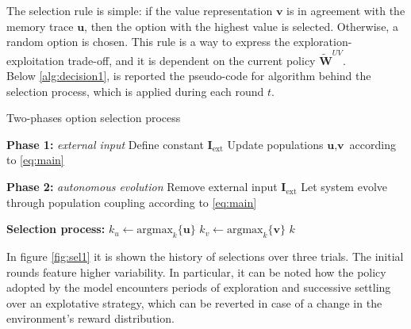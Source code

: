 \noindent The selection rule is simple: if the value representation $\textbf{v}$ is in agreement with the memory trace $\textbf{u}$, then the option with the highest value is selected. Otherwise, a random option is chosen.
This rule is a way to express the exploration-exploitation trade-off, and it is dependent on the current policy $\tilde{\textbf{W}}^{UV}$. \\ Below \ref{alg:decision1}, is reported the pseudo-code for algorithm behind the selection process, which is applied during each round $t$.

\begin{algorithm}[ht]
\caption{Two-phases option selection process}
\label{alg:decision}
\SetAlgoLined
{}


\textbf{Phase 1:} \textit{external input} 
Define constant $\textbf{I}_{\text{ext}}$\;
Update populations $\textbf{u}, \textbf{v}$ according to \ref{eq:main}\;

\textbf{Phase 2:} \textit{autonomous evolution} 
Remove external input $\textbf{I}_{\text{ext}}$\;
Let system evolve through population coupling according to \ref{eq:main}\;

\textbf{Selection process:}\;
$k_{u} \gets \text{argmax}_{k}\{\textbf{u}\}$\;
$k_{v} \gets \text{argmax}_{k}\{\textbf{v}\}$\;
\Return $k$
\end{algorithm}\label{alg:decision1}

\noindent In figure \ref{fig:sel1} it is shown the history of selections over three trials. The initial rounds feature higher variability. In particular, it can be noted how the policy adopted by the model encounters periods of exploration and successive settling over an explotative strategy, which can be reverted in case of a change in the environment's reward distribution.

